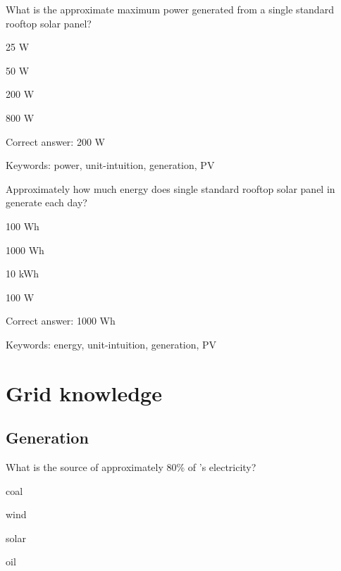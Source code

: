 \begin{question}
	\item What is the approximate maximum power generated from a single standard rooftop solar panel?
\end{question}

\begin{answer}
	\item 25 W
	\item 50 W
	\item 200 W
	\item 800 W
\end{answer}

Correct answer: 200 W

Keywords: power, unit-intuition, generation, PV

\begin{question}
	\item Approximately how much energy does single standard rooftop solar panel in \Hawaii generate each day?
\end{question}

\begin{answer}
	\item 100 Wh
	\item 1000 Wh
	\item 10 kWh
	\item 100 W
\end{answer}

Correct answer: 1000 Wh

Keywords: energy, unit-intuition, generation, PV


\section{Grid knowledge}

\subsection{Generation}

\begin{question}
	\item What is the source of approximately 80\% of \Hawaii's electricity?
\end{question}

\begin{answer}
	\item coal
	\item wind
	\item solar
	\item oil
\end{answer}

